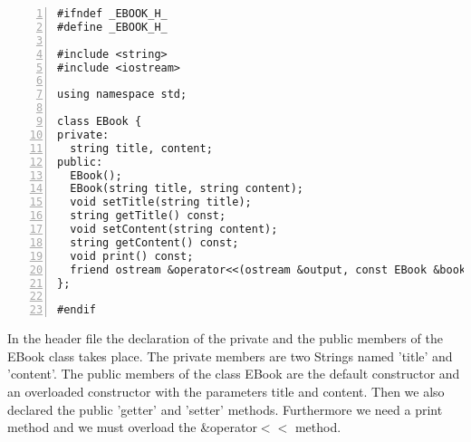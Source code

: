 \documentclass{article}
\begin{document}
\begin{lstlisting}[basicstyle=\footnotesize\ttfamily, numbers=left, stepnumber=1, numberstyle = \normalsize, caption={My Caption}]
#ifndef _EBOOK_H_
#define _EBOOK_H_

#include <string>
#include <iostream>

using namespace std;

class EBook {
private:
  string title, content;
public:
  EBook();
  EBook(string title, string content);
  void setTitle(string title);
  string getTitle() const;
  void setContent(string content);
  string getContent() const;
  void print() const;
  friend ostream &operator<<(ostream &output, const EBook &book);
};

#endif

\end{lstlisting}
\normalsize{In the header file the declaration of the private and the public members of the EBook class takes place.\newline
  The private members are two Strings named 'title' and 'content'.
  The public members of the class EBook are the default constructor and an overloaded constructor with the parameters title and content.\newline
Then we also declared the public 'getter' and 'setter' methods. Furthermore we need a print method and we must overload the \&operator$<<$ method.}\newline

\newpage
\end{document}
